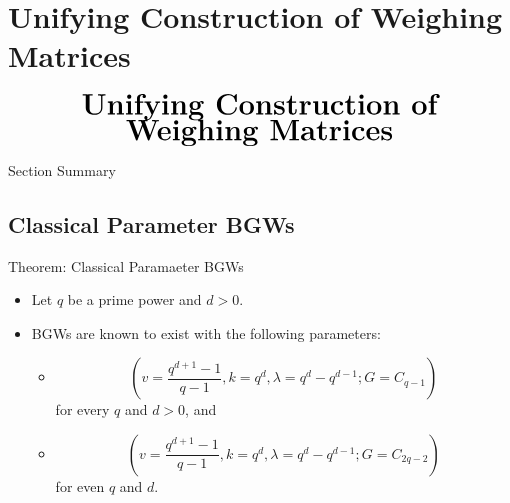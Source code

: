 \documentclass{beamer}
\begin{document}

\section{Unifying Construction of Weighing Matrices}

\begin{frame}
  \[
    \begin{array}{c}
      \text{\huge\bf Unifying Construction of}
      \\
      \text{\huge\bf Weighing Matrices}
    \end{array}
  \]
\end{frame}

\begin{frame}{Section Summary}
  \tableofcontents[sections={3}]
\end{frame}


\subsection{Classical Parameter BGWs}

\begin{frame}

  \begin{block}{Theorem: Classical Paramaeter BGWs}
    \begin{itemize}
    \item Let $q$ be a prime power and $d>0$.
    \item BGWs are known to exist with the following parameters:
      \begin{itemize}
      \item
        \[
          \left(
            v = \frac{q^{d+1}-1}{q-1}, k = q^d, \lambda = q^d-q^{d-1}; G = C_{q-1}
          \right)
        \]
        for every $q$ and $d>0$, and
      \item
        \[
          \left(
            v = \frac{q^{d+1}-1}{q-1}, k = q^d, \lambda = q^d-q^{d-1}; G = C_{2q-2}
          \right)
        \]
        for even $q$ and $d$.
      \end{itemize}
    \end{itemize}
  \end{block}
  
\end{frame}
\end{document}

